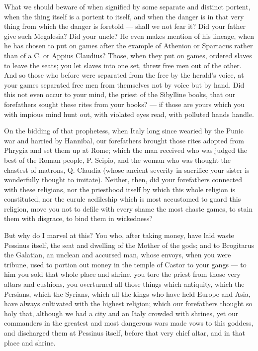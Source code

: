  What we should beware of when signified by some separate and distinct portent, when the thing itself is a portent to itself, and when the danger is in that very thing from which the danger is foretold --- shall we not fear it? Did your father give such Megalesia? Did your uncle? He even makes mention of his lineage, when he has chosen to put on games after the example of Athenion or Spartacus rather than of a C. or Appius Claudius? Those, when they put on games, ordered slaves to leave the seats; you let slaves into one set, threw free men out of the other. And so those who before were separated from the free by the herald's voice, at your games separated free men from themselves not by voice but by hand. Did this not even occur to your mind, the priest of the Sibylline books, that our forefathers sought these rites from your books? --- if those are yours which you with impious mind hunt out, with violated eyes read, with polluted hands handle.

 On the bidding of that prophetess, when Italy long since wearied by the Punic war and harried by Hannibal, our forefathers brought those rites adopted from Phrygia and set them up at Rome; which the man received who was judged the best of the Roman people, P. Scipio, and the woman who was thought the chastest of matrons, Q. Claudia (whose ancient severity in sacrifice your sister is wonderfully thought to imitate). Neither, then, did your forefathers connected with these religions, nor the priesthood itself by which this whole religion is constituted, nor the curule aedileship which is most accustomed to guard this religion, move you not to defile with every shame the most chaste games, to stain them with disgrace, to bind them in wickedness?

 But why do I marvel at this? You who, after taking money, have laid waste Pessinus itself, the seat and dwelling of the Mother of the gods; and to Brogitarus the Galatian, an unclean and accursed man, whose envoys, when you were tribune, used to portion out money in the temple of Castor to your gangs --- to him you sold that whole place and shrine, you tore the priest from those very altars and cushions, you overturned all those things which antiquity, which the Persians, which the Syrians, which all the kings who have held Europe and Asia, have always cultivated with the highest religion; which our forefathers thought so holy that, although we had a city and an Italy crowded with shrines, yet our commanders in the greatest and most dangerous wars made vows to this goddess, and discharged them at Pessinus itself, before that very chief altar, and in that place and shrine.

